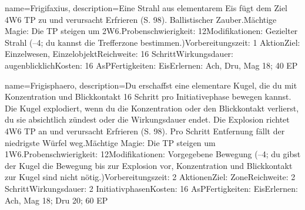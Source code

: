 {
    name={Frigifaxius},
    description={Eine Strahl aus elementarem Eis fügt dem Ziel 4W6 TP zu und verursacht Erfrieren (S. 98). Ballistischer Zauber.\newline Mächtige Magie: Die TP steigen um 2W6.\newline Probenschwierigkeit: 12\newline Modifikationen: Gezielter Strahl (–4; du kannst die Trefferzone bestimmen.)\newline Vorbereitungszeit: 1 Aktion\newline Ziel: Einzelwesen, Einzelobjekt\newline Reichweite: 16 Schritt\newline Wirkungsdauer: augenblicklich\newline Kosten: 16 AsP\newline Fertigkeiten: Eis\newline Erlernen: Ach, Dru, Mag 18; 40 EP}
}


{
    name={Frigisphaero},
    description={Du erschaffst eine elementare Kugel, die du mit Konzentration und Blickkontakt 16 Schritt pro Initiativephase bewegen kannst. Die Kugel explodiert, wenn du die Konzentration oder den Blickkontakt verlierst, du sie absichtlich zündest oder die Wirkungsdauer endet. Die Explosion richtet 4W6 TP an und verursacht Erfrieren (S. 98). Pro Schritt Entfernung fällt der niedrigste Würfel weg.\newline Mächtige Magie: Die TP steigen um 1W6.\newline Probenschwierigkeit: 12\newline Modifikationen: Vorgegebene Bewegung (–4; du gibst der Kugel die Bewegung bis zur Explosion vor, Konzentration und Blickkontakt zur Kugel sind nicht nötig.)\newline Vorbereitungszeit: 2 Aktionen\newline Ziel: Zone\newline Reichweite: 2 Schritt\newline Wirkungsdauer: 2 Initiativphasen\newline Kosten: 16 AsP\newline Fertigkeiten: Eis\newline Erlernen: Ach, Mag 18; Dru 20; 60 EP}
}


